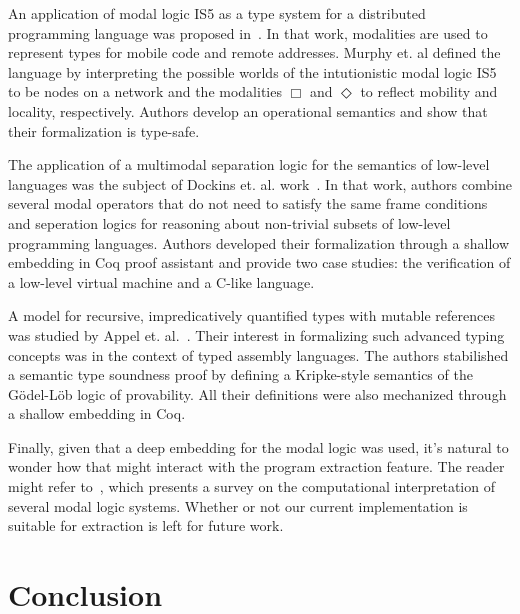 \documentclass[sigconf]{acmart}
\begin{document}
An application of modal logic IS5 as a type system for a distributed
programming language was proposed in~\cite{Murphy04}. 
In that work, modalities are used to represent types for mobile code
and remote addresses. Murphy et. al defined the language by interpreting
the possible worlds of the intutionistic modal logic IS5 to be nodes on a
network and the modalities $\Box$ and $\Diamond$ to reflect mobility and
locality, respectively. Authors develop an operational semantics and show
that their formalization is type-safe.

The application of a multimodal separation logic for the semantics of low-level languages
was the subject of Dockins et. al. work~\cite{Dockins08}. In that work, authors
combine several modal operators that do not need to satisfy the same frame
conditions and seperation logics for reasoning about non-trivial subsets of
low-level programming languages. Authors developed their formalization through a
shallow embedding in Coq proof assistant and provide two case studies:
the verification of a low-level virtual machine and a C-like language.

A model for recursive, impredicatively quantified types with mutable references
was studied by Appel et. al.~\cite{Appel07}. Their interest in formalizing such
advanced typing concepts was in the context of typed assembly languages.
The authors stabilished a semantic type soundness proof by defining a Kripke-style 
semantics of the G\"odel-L\"ob logic of provability. All their definitions were
also mechanized through a shallow embedding in Coq.

Finally, given that a deep embedding for the modal logic was used, it's
natural to wonder how that might interact with the program extraction feature. The
reader might refer to~\cite{Kavvos16c}, which presents a survey on the computational
interpretation of several modal logic systems. Whether or not our current implementation
is suitable for extraction is left for future work.


\section{Conclusion}\label{sec:conclusion}
\end{document}
